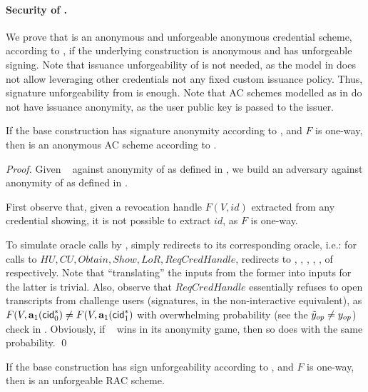\paragraph{Security of \CUASRAC.} %
We prove that \CUASRAC is an anonymous and unforgeable anonymous credential
scheme, according to \cite{fhs19}, if the underlying \CUASGen construction
is anonymous and has unforgeable signing. Note that issuance unforgeability
of \CUASGen is not needed, as the model in \cite{fhs19} does not allow
leveraging other credentials not any fixed custom issuance policy. Thus,
signature unforgeability from \UAS is enough. Note that AC schemes modelled
as in \cite{fhs19} do not have issuance anonymity, as the user public key
is passed to the issuer.

\begin{theorem}
  \label{thm:anon-cuasac}
  If the base \CUASGen construction has signature anonymity according to
  , and $F$ is one-way, then \CUASAC is an
  anonymous AC scheme according to \cite{fhs19}.
\end{theorem}

\begin{proof}
  Given \adv~ against anonymity of \CUASRAC as defined in
  , we build an adversary \advB against anonymity of
  \CUASGen as defined in .

  First observe that, given a revocation handle $F(V,id)$ extracted from any
  credential showing, it is not possible to extract $id$, as $F$ is one-way.
  
  To simulate oracle calls by \adv, \advB simply redirects to its corresponding
  oracle, i.e.: for calls to $HU,CU,Obtain,Show,LoR,ReqCredHandle$, \advB
  redirects to \HUGEN, \CUGEN, \OBTAIN, \SIGN, \CHALb, of \OPEN respectively.
  Note that ``translating'' the inputs from the former into inputs for the
  latter is trivial. Also, observe that $ReqCredHandle$ essentially refuses to
  open transcripts from challenge users (signatures, in the non-interactive
  equivalent), as $F(V,\mathbf{a}_1(\mathsf{cid}^*_0) \neq F(V,\mathbf{a}_1(\mathsf{cid}^*_1)$ with
  overwhelming probability (see the $\tilde{y}_{op} \neq y_{op}$) check in
  . Obviously, if \adv~ wins in its anonymity game, then
  so does \advB with the same probability.
  \qed
\end{proof}

\begin{theorem}
  If the base \CUASGen construction has sign unforgeability according to
  , and $F$ is one-way, then \CUASRAC is an
  unforgeable RAC scheme.
\end{theorem}

